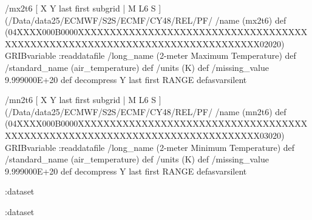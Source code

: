 \begin{ingrid}
/mx2t6 { [ X Y last first subgrid | M L6 S ] (/Data/data25/ECMWF/S2S/ECMF/CY48/REL/PF/%
/name (mx2t6) def
(04XXXX000B0000XXXXXXXXXXXXXXXXXXXXXXXXXXXXXXXXXXXXXXXXXXXXXXXXXXXXXXXXXXXXXXXXXXXXXXXXXXXX02020) GRIBvariable
:readdatafile
/long_name (2-meter Maximum Temperature) def
/standard_name (air_temperature) def
/units (K) def
/missing_value 9.999000E+20 def
decompress
Y last first RANGE
} defasvarsilent

/mn2t6 { [ X Y last first subgrid | M L6 S ] (/Data/data25/ECMWF/S2S/ECMF/CY48/REL/PF/%
/name (mn2t6) def
(04XXXX000B0000XXXXXXXXXXXXXXXXXXXXXXXXXXXXXXXXXXXXXXXXXXXXXXXXXXXXXXXXXXXXXXXXXXXXXXXXXXXX03020) GRIBvariable
:readdatafile
/long_name (2-meter Minimum Temperature) def
/standard_name (air_temperature) def
/units (K) def
/missing_value 9.999000E+20 def
decompress
Y last first RANGE
} defasvarsilent


:dataset


:dataset
\end{ingrid}
